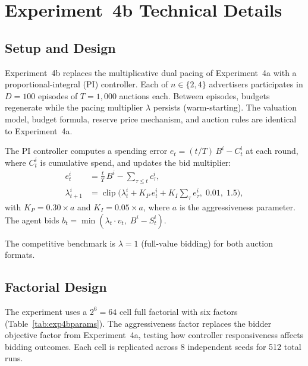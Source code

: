 \section{Experiment~4b Technical Details}
\label{sec:exp4b_appendix}

\subsection{Setup and Design}

Experiment~4b replaces the multiplicative dual pacing of Experiment~4a with a proportional-integral (PI) controller. Each of $n \in \{2, 4\}$ advertisers participates in $D = 100$ episodes of $T = 1{,}000$ auctions each. Between episodes, budgets regenerate while the pacing multiplier $\lambda$ persists (warm-starting). The valuation model, budget formula, reserve price mechanism, and auction rules are identical to Experiment~4a.

The PI controller computes a spending error $e_t = (t/T)\,B^i - C_t^i$ at each round, where $C_t^i$ is cumulative spend, and updates the bid multiplier:
\begin{align}
  e_t^i &= \tfrac{t}{T}\,B^i - {\textstyle\sum_{\tau \le t}} c_\tau^i, \label{eq:pid_error_exp4b}\\
  \lambda_{t+1}^i &= \operatorname{clip}\!\bigl(\lambda_t^i + K_P\,e_t^i + K_I\!\textstyle\sum_{\tau} e_\tau^i,\; 0.01,\; 1.5\bigr), \label{eq:pid_update_exp4b}
\end{align}
with $K_P = 0.30 \times a$ and $K_I = 0.05 \times a$, where $a$ is the aggressiveness parameter. The agent bids $b_t = \min(\lambda_t \cdot v_t,\; B^i - S_t^i)$.

The competitive benchmark is $\lambda = 1$ (full-value bidding) for both auction formats.

\subsection{Factorial Design}

The experiment uses a $2^6 = 64$ cell full factorial with six factors (Table~\ref{tab:exp4bparams}). The aggressiveness factor replaces the bidder objective factor from Experiment~4a, testing how controller responsiveness affects bidding outcomes. Each cell is replicated across 8 independent seeds for 512 total runs.

